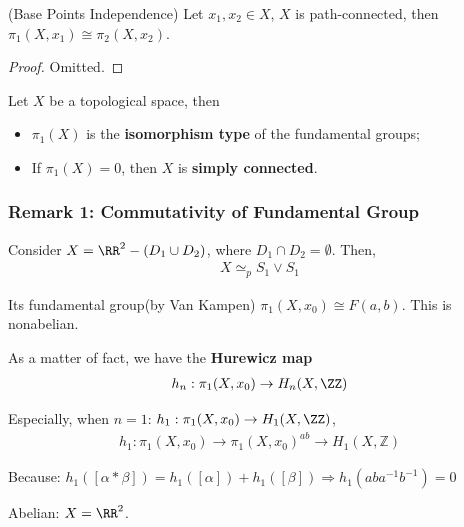 \documentclass[Total.tex]{subfiles}
\begin{document}
	\begin{corollary}
		(Base Points Independence) Let $x_1,x_2\in X$, $X$ is path-connected, then $\pi_1(X,x_1)\cong \pi_2(X,x_2)$.
	\end{corollary}
	\begin{proof}
		Omitted.
	\end{proof}
	
	\begin{Def}
		Let $X$ be a topological space, then 
		\begin{itemize}
			\item $\pi_1(X)$ is the \textbf{isomorphism type} of the fundamental groups;
			\item If $\pi_1(X)=0$, then $X$ is \textbf{simply connected}.
		\end{itemize}
	\end{Def}
	\subsubsection{Remark 1: Commutativity of Fundamental Group}
		\begin{example}
			Consider $X=\RR^2-(D_1\cup D_2)$, where $D_1\cap D_2=\emptyset$. Then, 
			\begin{gather*}
				X\simeq_p S_1\vee S_1
			\end{gather*}
			
			Its fundamental group(by Van Kampen) $\pi_1(X,x_0)\cong F(a,b)$. This is nonabelian.
		\end{example}
		
		As a matter of fact, we have the \textbf{Hurewicz map}
		\begin{gather*}
			h_n:\pi_1(X,x_0)\rightarrow H_n(X,\ZZ)
		\end{gather*}
		
		Especially, when $n=1$: $h_1:\pi_1(X,x_0)\rightarrow H_1(X,\ZZ)$,
		\begin{gather*}
			h_1:\pi_1(X,x_0)\rightarrow \pi_1(X,x_0)^{ab}\rightarrow H_1(X,\mathbb{Z})
		\end{gather*}
		
		Because: $h_1([\alpha*\beta])=h_1([\alpha])+h_1([\beta])\Rightarrow h_1(aba^{-1}b^{-1})=0$
		
		\begin{example}
			Abelian: $X=\RR^2$.
		\end{example}
\end{document}
